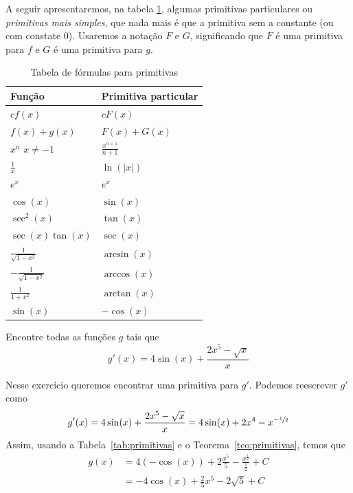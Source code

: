 A seguir apresentaremos, na tabela \ref{tab:primimivas}, algumas primitivas
particulares ou \textit{primitivas mais simples}, que nada mais é que a
primitiva sem a constante (ou com constate $0$). Usaremos a notação $F$ e $G$,
significando que $F$ é uma primitiva para $f$ e $G$ é uma primitiva para $g$.

\begin{table}
  \centering
  \renewcommand*{\arraystretch}{1.7}
  \begin{tabular}{ll}
    \hline
    Função                      & Primitiva particular    \\ \hline\hline
    \(cf(x)\)                   & \(cF(x) \)              \\
    \(f(x)+g(x)\)               & \(F(x)+G(x)\)           \\
    \(x^n \,\, x \neq -1\)      & \(\frac{x^{n+1}}{n+1}\) \\
    \(\frac{1}{x}\)             & \(\ln(\vert x \vert)\)  \\
    \(e^x\)                     & \(e^x\)                 \\
    \( \cos(x)\)                & \(\sin(x)\)             \\
    \(\sec^2(x)\)               & \(\tan(x)\)             \\
    \(\sec(x) \tan(x)\)         & \(\sec(x)\)             \\
    \(\frac{1}{\sqrt{1-x^2}}\)  & \(\arcsin(x)\)          \\
    \(-\frac{1}{\sqrt{1-x^2}}\) & \(\arccos(x)\)          \\
    \(\frac{1}{1+x^2}\)         & \(\arctan(x)\)          \\
    \(\sin(x) \)                & \(-\cos(x)\)            \\ \hline
  \end{tabular}
  \caption{Tabela de fórmulas para primitivas}
  \label{tab:primimivas}
\end{table}

\begin{example}
  Encontre todas as funções $g$ tais que
  \[
  g'(x)= 4 \sin(x)+ \frac{2x^5- \sqrt{x}}{x}
  \]

  \solution
  Nesse exercício queremos encontrar uma primitiva para $g'$.
  Podemos reescrever $g'$ como
  \[
  g'(x)
  = 4 \sin(x) + \frac{2x^5- \sqrt{x}}{x}
  = 4 \sin(x) + 2x^4 -x^{-\sfrac{1}{2}}
  \]
  Assim, usando a Tabela~\ref{tab:primitivas} e o
  Teorema~\ref{teo:primitivas}, temos que
  \begin{align*}
    g(x) & = 4(-\cos(x))+ 2 \frac{x^5}{5}-\frac{x^{\frac{1}{2}}}{\frac{1}{2}}+C \\
    & = -4 \cos(x)+ \frac{2}{5}x^5-2 \sqrt{5}+C
  \end{align*}
\end{example}

